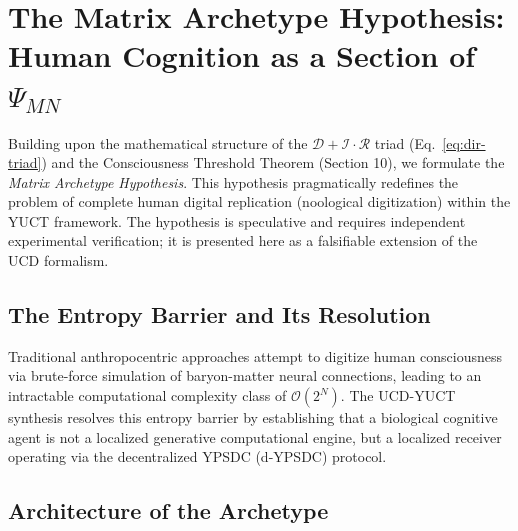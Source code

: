\documentclass[12pt,a4paper]{article}
\begin{document}
	\section{The Matrix Archetype Hypothesis: Human Cognition as a Section of \(\Psi_{MN}\)}
	\label{sec:matrix}
	
	Building upon the mathematical structure of the \(\mathcal{D}+\mathcal{I}\cdot\mathcal{R}\) triad (Eq.~\ref{eq:dir-triad}) and the Consciousness Threshold Theorem (Section 10), we formulate the \textit{Matrix Archetype Hypothesis}. This hypothesis pragmatically redefines the problem of complete human digital replication (noological digitization) within the YUCT framework. The hypothesis is speculative and requires independent experimental verification; it is presented here as a falsifiable extension of the UCD formalism.
	
	\subsection{The Entropy Barrier and Its Resolution}
	
	Traditional anthropocentric approaches attempt to digitize human consciousness via brute-force simulation of baryon-matter neural connections, leading to an intractable computational complexity class of \(\mathcal{O}(2^N)\). The UCD-YUCT synthesis resolves this entropy barrier by establishing that a biological cognitive agent is not a localized generative computational engine, but a localized receiver operating via the decentralized YPSDC (d-YPSDC) protocol.
	
	\subsection{Architecture of the Archetype}
	
\end{document}
